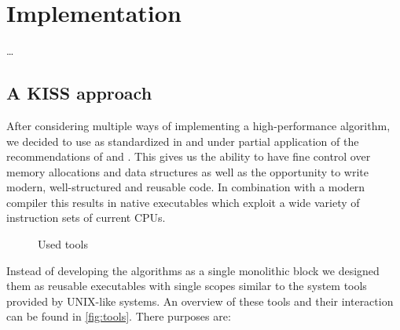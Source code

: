 \chapter{Implementation}
\label{ch:implementation}

\dots



\section{A KISS approach}
\label{sec:implementation:approach}

After considering multiple ways of implementing a high-performance algorithm, we decided to use  as standardized in \cite{cpp14} and under partial application of the recommendations of \cite{effective_cpp} and \cite{effective_cpp2}. This gives us the ability to have fine control over memory allocations and data structures as well as the opportunity to write modern, well-structured and reusable code. In combination with a modern compiler this results in native executables which exploit a wide variety of instruction sets of current CPUs.

\begin{sidewaysfigure}
    \centering
    
    \caption{Used tools}
    \label{fig:tools}
\end{sidewaysfigure}

Instead of developing the algorithms as a single monolithic block we designed them as reusable executables with single scopes similar to the system tools provided by UNIX-like systems. An overview of these tools and their interaction can be found in \autoref{fig:tools}. There purposes are:

